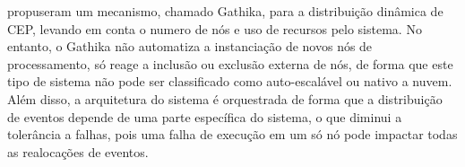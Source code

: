 \cite{randika2018gathika} propuseram um mecanismo, chamado Gathika, para a distribuição dinâmica de CEP, levando em conta o numero de nós e uso de recursos pelo sistema. No entanto, o Gathika não automatiza a instanciação de novos nós de processamento, só reage a inclusão ou exclusão externa de nós, de forma que este tipo de sistema não pode ser classificado como auto-escalável ou nativo a nuvem. Além disso, a arquitetura do sistema é orquestrada de forma que a distribuição de eventos depende de uma parte específica do sistema, o que diminui a tolerância a falhas, pois uma falha de execução em um só nó pode impactar todas as realocações de eventos.















